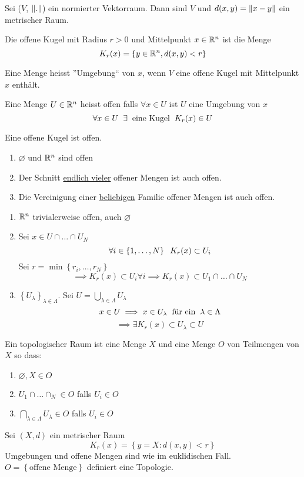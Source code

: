 \begin{Lem}
  Sei ($V$, $\left\| . \right\|$) ein normierter Vektorraum. Dann sind $V$ und $d(x,y)=\left\| x-y \right\|$ ein metrischer Raum.
\end{Lem}
\begin{Def}
  Die offene Kugel mit Radius $r>0$ und Mittelpunkt $x\in\mathbb{R}^n$ ist die Menge
  \[K_r(x)=\left\{ y\in\mathbb{R}^n, d(x,y)<r \right\}\]
\end{Def}
\begin{Def}
  Eine Menge heisst ''Umgebung`` von $x$, wenn $V$ eine offene Kugel mit Mittelpunkt $x$ enth\"alt.
\end{Def}
\begin{Def}
  Eine Menge $U\in\mathbb{R}^n$ heisst offen falls $\forall x\in U$ ist $U$ eine Umgebung von $x$
  \[\forall x\in U\hspace{2mm}\exists \hspace{2mm}\text{eine Kugel}\hspace{2mm} K_r(x)\in U\]
\end{Def}
\begin{Bem}
  Eine offene Kugel ist offen.
\end{Bem}
\begin{Sat}
  \begin{enumerate}
    \item $\varnothing$ und $\mathbb{R}^n$ sind offen
    \item Der Schnitt \ul{endlich vieler} offener Mengen ist auch offen.
    \item Die Vereinigung einer \ul{beliebigen} Familie offener Mengen ist auch offen.
  \end{enumerate}
\end{Sat}
\begin{Bew}
  \begin{enumerate}
    \item $\mathbb{R}^n$ trivialerweise offen, auch $\varnothing$
    \item Sei $x\in U\cap\dots\cap U_N$
      \[\forall i\in\left\{ 1,\dots,N \right\}\hspace{2mm} K_r(x)\subset U_i\]
      Sei $r=\min\left\{ r_i,\dots,r_N \right\}$
      \[\implies K_r(x)\subset U_i\forall i\implies K_r(x)\subset U_1\cap\dots\cap U_N\]
    \item $\left\{ U_\lambda \right\}_{\lambda\in \Lambda}$. Sei $U=\bigcup_{\lambda\in\Lambda}U_\lambda$
      \[x\in U\implies x\in U_\lambda\hspace{2mm}\text{f\"ur ein}\hspace{2mm}\lambda\in\Lambda\]
      \[\implies \exists K_r(x)\subset U_\lambda\subset U\]
  \end{enumerate}
\end{Bew}
\begin{Def}
  Ein topologischer Raum ist eine Menge $X$ und eine Menge $O$ von Teilmengen von $X$ so dass:
  \begin{enumerate}
    \item $\varnothing, X\in O$
    \item $U_1\cap\dots\cap_N\in O$ falls $U_i\in O$
    \item $\bigcap_{\lambda\in\Lambda}U_\lambda\in O$ falls $U_i\in O$
  \end{enumerate}
\end{Def}
\begin{Sat}
  Sei $(X,d)$ ein metrischer Raum
  \[K_r(x)=\left\{ y=X: d(x,y)<r \right\}\]
  Umgebungen und offene Mengen sind wie im euklidischen Fall. $O=\left\{ \text{offene Menge} \right\}$ definiert eine Topologie.
\end{Sat}
